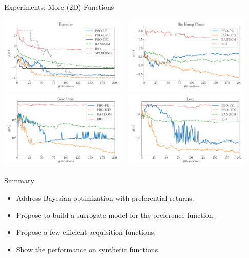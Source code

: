 \documentclass[13pt,aspectratio=1610]{beamer}
\begin{document}
\begin{frame}{Experiments: More (2D) Functions}
\begin{center}
\includegraphics[width=0.45\textwidth]{results_forrester_new.pdf} ~
\includegraphics[width=0.45\textwidth]{results_sixhump_new.pdf} \\
\includegraphics[width=0.45\textwidth]{results_goldstein.pdf} ~
\includegraphics[width=0.45\textwidth]{results_levy.pdf} 
\end{center}
\end{frame}

\begin{frame}{Summary}
\begin{itemize}
\item Address Bayesian optimization with preferential returns.
\item Propose to build a surrogate model for the preference function.
\item Propose a few efficient acquisition functions.
\item Show the performance on synthetic functions.
\end{itemize}
\end{frame}
\end{document}
